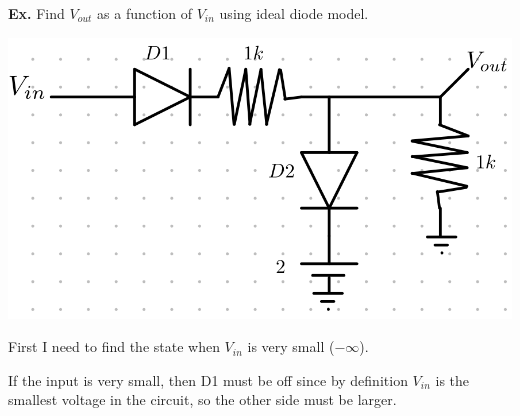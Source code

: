 \documentclass[12pt,letterpaper]{article} \usepackage{amsmath} \usepackage{graphicx} \usepackage[margin=1in]{geometry} \usepackage{longtable}  \usepackage{amssymb}
\begin{document}
	\begin{mdframed}[]
	\textbf{Ex. }Find $V_{out}$ as a function of $V_{in}$ using ideal diode model.
	\begin{center}
		\includegraphics[width=0.4\linewidth]{diodes-plotting-1.1}
	\end{center}
	First I need to find the state when $V_{in}$ is very small ($-\infty$).
	
	If the input is very small, then D1 must be off since by definition $V_{in}$ is the smallest voltage in the circuit, so the other side must be larger. 
	

\end{mdframed}
\end{document}
